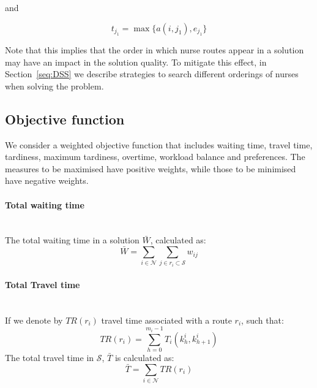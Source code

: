 \documentclass[a4paper,11pt]{elsarticle}
\begin{document}
and

\begin{equation}\label{eq:earliest_possible_start_assumption2}
    t_{j_1} = \max \{ a(i,j_1), e_{j_1} \}
\end{equation}


Note that this implies that the order in which nurse routes appear in a solution may have an impact in the solution quality. To mitigate this effect, in Section~\ref{seq:DSS} we describe strategies to search different orderings of nurses when solving the problem.

\subsection{Objective function}
We consider a weighted objective function that includes waiting time, travel time, tardiness, maximum tardiness, overtime, workload balance and preferences. The measures to be maximised have positive weights, while those to be minimised have negative weights.

\paragraph{Total waiting time}\ \\
The total waiting time in a solution $\bar{W}$, calculated as:
\begin{equation}
     \bar{W} = \sum_{i \in \mathcal{N}} \sum_{j \in r_i \subset \mathcal{S}} w_{ij}
\end{equation}

\paragraph{Total Travel time}\ \\

If we denote by $TR(r_i)$ travel time associated with a route $r_i$, such that:
\begin{equation}
    TR(r_i) =  \sum_{h = 0}^{m_i - 1} T_i(k^i_h, k^i_{h + 1})
\end{equation}
The total travel time in $\mathcal{S}$, $\bar{T}$ is calculated as:
\begin{equation}
     \bar{T} = \sum_{i \in \mathcal{N}}  TR(r_i)
\end{equation}
\end{document}
